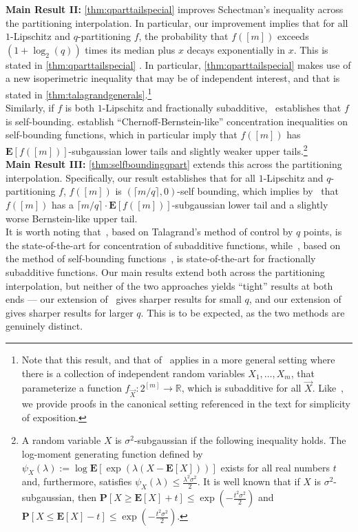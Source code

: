 \documentclass[11pt]{article}\usepackage{amsfonts}
\numberwithin{theorem}{subsection}
\newcommand{\prob}{\mathbf{P}}
\newcommand{\expect}{\mathbf{E}}
\begin{document}
\noindent\textbf{Main Result II:} \cref{thm:qparttailspecial} improves Schectman's inequality across the partitioning interpolation. In particular, our improvement implies that for all $1$-Lipschitz and $q$-partitioning $f$, the probability that $f([m])$ exceeds $(1+\log_2(q))$ times its median plus $x$ decays exponentially in $x$. This is stated in \cref{thm:qparttailspecial} . In particular, \cref{thm:qparttailspecial}  makes use of a new isoperimetric inequality that may be of independent interest, and that is stated in \cref{thm:talagrandgenerals}.\footnote{Note that this result, and that of~\cite{schectman} applies in a more general setting where there is a collection of independent random variables $X_1,\ldots, X_m$, that parameterize a function $f_{\vec{X}}: 2^{[m]}\rightarrow \mathbb{R}$, which is subadditive for all $\vec{X}$. Like~\cite{Vondrak10}, we provide proofs in the canonical setting referenced in the text for simplicity of exposition.}\\

Similarly, if $f$ is both $1$-Lipschitz and fractionally subadditive,~\cite{Vondrak10} establishes that $f$ is self-bounding. \cite{BoucheronLM00} establish ``Chernoff-Bernstein-like'' concentration inequalities on self-bounding functions, which in particular imply that $f([m])$ has $\expect[f([m])]$-subgaussian lower tails and slightly weaker upper tails.\footnote{A random variable $X$ is $\sigma^2$-subgaussian if the following inequality holds.  The log-moment generating function defined by $\psi_X(\lambda):=\log \expect[\exp(\lambda(X - \expect[X]))]$ exists for all real numbers $t$ and, furthermore, satisfies 
$\psi_X(\lambda)\le \frac{\lambda^2\sigma^2}{2}.$ It is well known that if $X$ is $\sigma^2$-subgaussian, then
$\prob[X\ge \expect[X] + t]\le \exp(-\frac{t^2\sigma^2}{2})$ and 
$\prob[X\le \expect[X] - t]\le \exp(-\frac{t^2\sigma^2}{2}).$
}\\

\noindent\textbf{Main Result III:} \cref{thm:selfboundingqpart} extends this across the partitioning interpolation. Specifically, our result establishes that for all $1$-Lipschitz and $q$-partitioning $f$, $f([m])$ is $(\lceil m/q \rceil,0)$-self bounding, which implies by~\cite{McDiarmidR06,BoucheronLM09} that $f([m])$ has a $\lceil m/q \rceil\cdot \expect[f([m])]$-subgaussian lower tail and a slightly worse Bernstein-like upper tail.\\

It is worth noting that~\cite{schectman}, based on Talagrand's method of control by $q$ points, is the state-of-the-art for concentration of subadditive functions, while~\cite{Vondrak10}, based on the method of self-bounding functions~\cite{BoucheronLM00,McDiarmidR06,BoucheronLM09}, is state-of-the-art for fractionally subadditive functions. Our main results extend both across the partitioning interpolation, but neither of the two approaches yields ``tight'' results at both ends --- our extension of~\cite{schectman} gives sharper results for small $q$, and our extension of~\cite{Vondrak10} gives sharper results for larger $q$. This is to be expected, as the two methods are genuinely distinct. 
\end{document}
